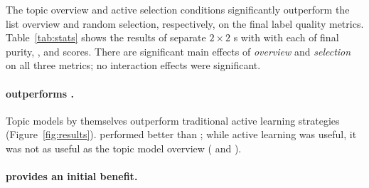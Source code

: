The topic overview and active selection conditions significantly
outperform the list overview and random selection, respectively, on
the final label quality metrics. Table~\ref{tab:stats} shows the
results of separate $2\times2$ s with  with each
of final purity, , and  scores. There are significant main
effects of \emph{overview} and \emph{selection} on all three metrics;
no interaction effects were significant.






\begin{table}[t!]
\small
{}
\caption{Results from $2\times2$  with  analyses on the
final purity, , and  metrics. Only main effects for
the factors of \emph{overview} and \emph{selection} are shown; no interaction
effects were statistically significant.  Topics and active learning
both had significant effects on quality scores.}
\label{tab:stats}
\end{table}

\paragraph{ outperforms .}

Topic models by themselves outperform traditional active learning
strategies (Figure~\ref{fig:results}).   performed
better than ; while active learning was useful, it was not as
useful as the topic model overview ( and ).





\paragraph{ provides an initial benefit.}

